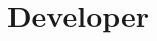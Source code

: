 \documentclass[11pt,a4paper,sans]{moderncv}        %
\title{Developer}                               %
\begin{document}
\makecvtitle



%


%

\end{document}

